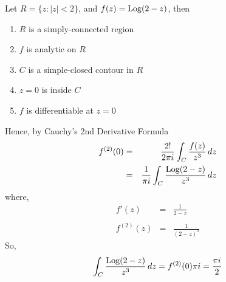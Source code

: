 \begin{itemize}
Let $R=\{ z: |z|<2 \}$, and $f(z)={\rm Log}(2-z)$, then
\begin{enumerate}
\item $R$ is a simply-connected region
\item $f$ is analytic on $R$
\item $C$ is a simple-closed contour in $R$
\item $z=0$ is inside $C$
\item $f$ is differentiable at $z=0$
\end{enumerate}
Hence, by Cauchy's 2nd Derivative Formula
\begin{eqnarray*}
f^{(2)}(0)
	&=& \frac{2!}{2\pi i} \int_C \frac{ f(z) }{ z^3 }\, dz \\
	&=& \frac{1}{\pi i} \int_C \frac{ {\rm Log}(2-z) }{ z^3 }\, dz
\end{eqnarray*}
where,
\begin{eqnarray*}
f'(z)	&=& \frac{1}{2-z} \\
\\
f^{(2)}(z)
	&=& \frac{1}{(2-z)^2}
\end{eqnarray*}
So,
\[
\int_C \frac{ {\rm Log}(2-z) }{ z^3 }\,dz = f^{(2)}(0)\pi i = \frac{\pi i}{2}
\]

\end{itemize}

